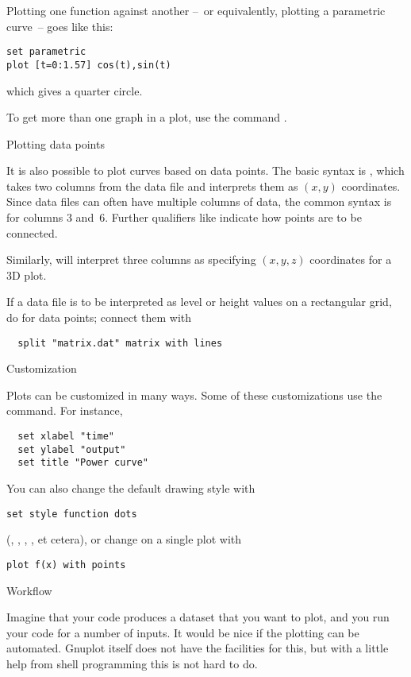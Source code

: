 Plotting one function against another --~or equivalently, plotting a
parametric curve~-- goes like this:
\begin{verbatim}
set parametric
plot [t=0:1.57] cos(t),sin(t)
\end{verbatim}
which gives a quarter circle.

To get more than one graph in a plot, use the command .

 {Plotting data points}

It is also possible to plot curves based on data points. The basic
syntax is , which takes two columns from the data
file and interprets them as $(x,y)$ coordinates. Since data files can often have
multiple columns of data, the common syntax is  for columns 3 and~6. Further qualifiers like  indicate how points are to be connected.

Similarly,  will interpret three
columns as specifying $(x,y,z)$ coordinates for a 3D plot.

If a data file is to be interpreted as level or height values on a
rectangular grid, do  for data points;
connect them with
\begin{verbatim}
  split "matrix.dat" matrix with lines
\end{verbatim}

 {Customization}

Plots can be customized in many ways. Some of these customizations use
the  command. For instance,
\begin{verbatim}
  set xlabel "time"
  set ylabel "output"
  set title "Power curve"
\end{verbatim}
You can also change the default drawing style with
\begin{verbatim}
set style function dots
\end{verbatim}
(, , , , et cetera), or
change on a single plot with
\begin{verbatim}
plot f(x) with points
\end{verbatim}

 {Workflow}

Imagine that your code produces a dataset that you want to plot, and
you run your code for a number of inputs. It would be nice if the
plotting can be automated. Gnuplot itself does not have the facilities
for this, but with a little help from shell programming this is not
hard to do.

